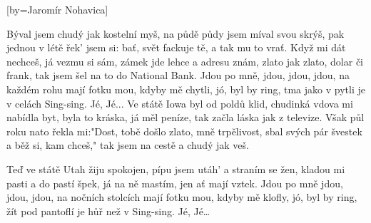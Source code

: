 [by={Jaromír Nohavica}]

\beginchorus{}
Býval jsem chudý jak kostelní myš,
na půdě půdy jsem míval svou skrýš,
\lrep{} pak jednou v létě řek' jsem si: bať,
svět fackuje tě, a tak mu to vrať. \rrep{}
Když mi dát nechceš, já vezmu si sám,
zámek jde lehce a adresu znám,
\lrep{} zlato jak zlato, dolar či frank,
tak jsem šel na to do National Bank. \rrep{}
Jdou po mně, jdou, jdou, jdou,
na každém rohu mají fotku mou,
kdyby mě chytli, jó, byl by ring,
tma jako v pytli je v celách Sing-sing. Jé, Jé... 
Ve státě Iowa byl od poldů klid,
chudinká vdova mi nabídla byt,
\lrep{} byla to kráska, já měl peníze,
tak začla láska jak z televize. \rrep{}
Však půl roku nato řekla mi:"Dost,
tobě došlo zlato, mně trpělivost,
\lrep{} sbal svých pár švestek a běž si, kam chceš,"
tak jsem na cestě a chudý jak veš. \rrep{}

Teď ve státě Utah žiju spokojen,
pípu jsem utáh' a straním se žen,
\lrep{} kladou mi pasti a do pastí špek,
já na ně mastím, jen ať mají vztek. \rrep{}
Jdou po mně jdou, jdou, jdou,
na nočních stolcích mají fotku mou,
kdyby mě klofly, jó, byl by ring,
žít pod pantoflí je hůř než v Sing-sing. Jé, Jé\ldots{}
\endchorus{}

\endsong{}
